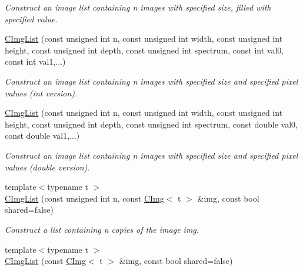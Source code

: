 \begin{DoxyCompactItemize}
\begin{DoxyCompactList}\small\item\em Construct an image list containing n images with specified size, filled with specified value. \item\end{DoxyCompactList}\item 
\hypertarget{structcimg__library_1_1CImgList_ab4966ec9780e7620cf383ddffb2ce768}{
\hyperlink{structcimg__library_1_1CImgList_ab4966ec9780e7620cf383ddffb2ce768}{CImgList} (const unsigned int n, const unsigned int width, const unsigned int height, const unsigned int depth, const unsigned int spectrum, const int val0, const int val1,...)}
\label{structcimg__library_1_1CImgList_ab4966ec9780e7620cf383ddffb2ce768}

\begin{DoxyCompactList}\small\item\em Construct an image list containing n images with specified size and specified pixel values (int version). \item\end{DoxyCompactList}\item 
\hypertarget{structcimg__library_1_1CImgList_a0d93bd3bdc808e65f85a3910b59f0d9d}{
\hyperlink{structcimg__library_1_1CImgList_a0d93bd3bdc808e65f85a3910b59f0d9d}{CImgList} (const unsigned int n, const unsigned int width, const unsigned int height, const unsigned int depth, const unsigned int spectrum, const double val0, const double val1,...)}
\label{structcimg__library_1_1CImgList_a0d93bd3bdc808e65f85a3910b59f0d9d}

\begin{DoxyCompactList}\small\item\em Construct an image list containing n images with specified size and specified pixel values (double version). \item\end{DoxyCompactList}\item 
\hypertarget{structcimg__library_1_1CImgList_a0a5348dae3a399ca8bbd40829ee66cf9}{
{\footnotesize template$<$typename t $>$ }\\\hyperlink{structcimg__library_1_1CImgList_a0a5348dae3a399ca8bbd40829ee66cf9}{CImgList} (const unsigned int n, const \hyperlink{structcimg__library_1_1CImg}{CImg}$<$ t $>$ \&img, const bool shared=false)}
\label{structcimg__library_1_1CImgList_a0a5348dae3a399ca8bbd40829ee66cf9}

\begin{DoxyCompactList}\small\item\em Construct a list containing n copies of the image img. \item\end{DoxyCompactList}\item 
\hypertarget{structcimg__library_1_1CImgList_aca5c48ef7b6a21acff229298d4662d6a}{
{\footnotesize template$<$typename t $>$ }\\\hyperlink{structcimg__library_1_1CImgList_aca5c48ef7b6a21acff229298d4662d6a}{CImgList} (const \hyperlink{structcimg__library_1_1CImg}{CImg}$<$ t $>$ \&img, const bool shared=false)}
\label{structcimg__library_1_1CImgList_aca5c48ef7b6a21acff229298d4662d6a}


\end{DoxyCompactItemize}
